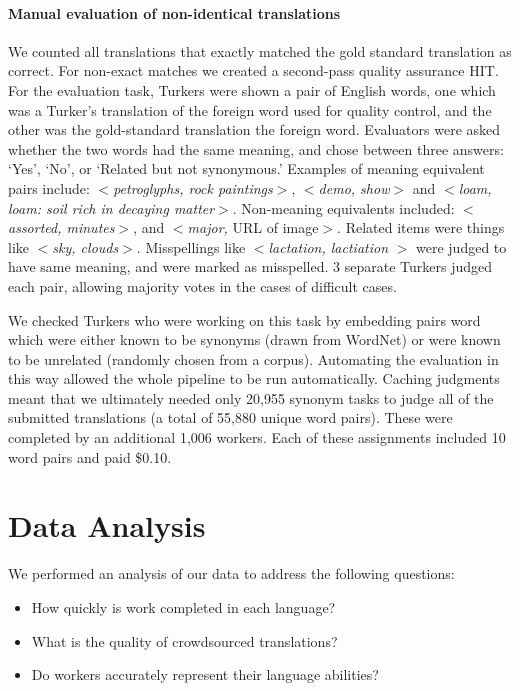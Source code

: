 \documentclass[11pt]{article}
\begin{document}
\paragraph{Manual evaluation of non-identical translations}
We counted all translations that exactly matched the gold standard translation as correct.  For non-exact matches we created a second-pass quality assurance HIT.  
For the evaluation task, Turkers were shown a pair of English words, one which was a Turker's translation of the foreign word used for quality control, and the other was the gold-standard translation the foreign word. Evaluators were asked whether the two words had the same meaning, and chose between three answers: `Yes', `No', or `Related but not synonymous.'  Examples of meaning equivalent pairs include: $<${\it petroglyphs, rock paintings}$>$, $<${\it demo, show}$>$ and  $<${\it loam, loam: soil rich in decaying matter}$>$.  Non-meaning equivalents included: $<${\it assorted, minutes}$>$, and $<${\it major,} URL of image$>$.  Related items were things like $<${\it sky, clouds}$>$. Misspellings like $<${\it lactation, lactiation} $>$ were judged to have same meaning, and were marked as misspelled.   3 separate Turkers judged each pair, allowing majority votes in the cases of difficult cases. 


We checked Turkers who were working on this task by embedding pairs word which were either known to be synonyms (drawn from WordNet) or were known to be unrelated (randomly chosen from a corpus). 
Automating the evaluation in this way allowed the whole pipeline to be run automatically.  Caching judgments meant that we ultimately needed only 
20,955 synonym tasks to judge all of the submitted translations (a total of 55,880 unique word pairs).  These were completed by an additional 1,006 workers.  Each of these assignments included 10 word pairs and paid \$0.10.


\section{Data Analysis}

We performed an analysis of our data to address the following questions:
\begin{itemize}
\item How quickly is work completed in each language? 
\item What is the quality of crowdsourced translations? 
\item Do workers accurately represent their language abilities? 
\end{itemize}
\end{document}
